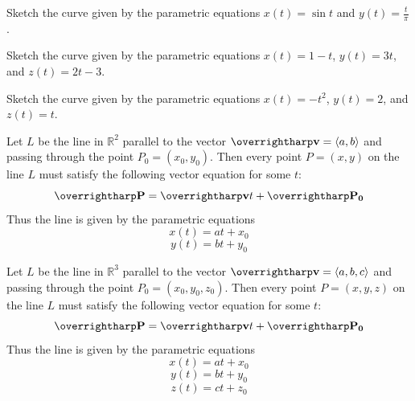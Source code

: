 \documentclass[letterpaper, twoside, 12pt]{book}
\begin{document}
          \begin{problem}
            Sketch the curve given by the parametric equations
            $x(t)=\sin t$ and $y(t)=\frac{t}{\pi}$.
          \end{problem}

          \begin{solution}

          \end{solution}

          \begin{problem}
            Sketch the curve given by the parametric equations
            $x(t)=1-t$, $y(t)=3t$, and $z(t)=2t-3$.
          \end{problem}

          \begin{solution}

          \end{solution}

          \begin{problem}
            Sketch the curve given by the parametric equations
            $x(t)=-t^2$, $y(t)=2$, and $z(t)=t$.
          \end{problem}

          \begin{solution}

          \end{solution}



\begin{theorem}
  Let $L$ be the line in $\mathbb R^2$ parallel to the vector $\harpvec v=\<a,b\>$
  and passing through the point $P_0=(x_0,y_0)$. Then every point $P=(x,y)$
  on the line $L$ must satisfy the following vector equation for some $t$:
  \[
    \harpvec{P} = \harpvec{v}t + \harpvec{P_0}
  \]
  Thus the line is given by the parametric equations
  \[
    x(t) = at + x_0
  \]
  \[
    y(t) = bt + y_0
  \]

  Let $L$ be the line in $\mathbb R^3$ parallel to the vector $\harpvec v=\<a,b,c\>$
  and passing through the point $P_0=(x_0,y_0,z_0)$. Then every point $P=(x,y,z)$
  on the line $L$ must satisfy the following vector equation for some $t$:
  \[
    \harpvec{P} = \harpvec{v}t + \harpvec{P_0}
  \]
  Thus the line is given by the parametric equations
  \[
    x(t) = at + x_0
  \]
  \[
    y(t) = bt + y_0
  \]
  \[
    z(t) = ct + z_0
  \]
\end{theorem}
\end{document}
